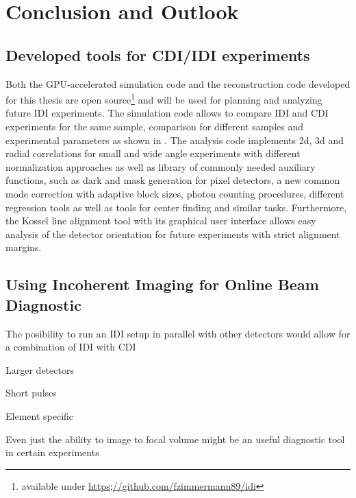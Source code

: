 \chapter{Conclusion and Outlook}

\section{Developed tools for CDI/IDI experiments}
Both the GPU-accelerated simulation code and the reconstruction code developed for this thesis are open source\footnote{available under \url{https;//github.com/fzimmermann89/idi}} and will be used for planning and analyzing future IDI experiments. The simulation code allows to compare IDI and CDI experiments for the same sample, comparison for different samples and experimental parameters as shown in .
The analysis code implements 2d, 3d and radial correlations for small and wide angle experiments with different normalization approaches as well as library of commonly needed auxiliary functions, such as dark and mask generation for pixel detectors, a new common mode correction with adaptive block sizes, photon counting procedures, different regression tools as well as tools for center finding and similar tasks.
Furthermore, the Kossel line alignment tool with its graphical user interface allows easy analysis of the detector orientation for future experiments with strict alignment margins.


\section{Using Incoherent Imaging for Online Beam Diagnostic}



The posibility to run an IDI setup in parallel with other detectors would allow for a combination of IDI with CDI

Larger detectors

Short pulses

Element specific 


Even just the ability to image to focal volume might be an useful diagnostic tool in certain experiments




